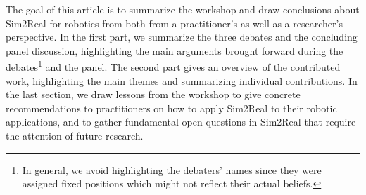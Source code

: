 The goal of this article is to summarize the workshop and draw conclusions about Sim2Real for robotics from both from a practitioner’s as well as a researcher’s perspective. In the first part, we summarize the three debates and the concluding panel discussion, highlighting the main arguments brought forward during the debates\footnote{In general, we avoid highlighting the debaters' names since they were assigned fixed positions which might not reflect their actual beliefs.} and the panel. The second part gives an overview of the contributed work, highlighting the main themes and summarizing individual contributions. In the last section, we draw lessons from the workshop to give concrete recommendations to practitioners on how to apply Sim2Real to their robotic applications, and to gather fundamental open questions in Sim2Real that require the attention of future research.


